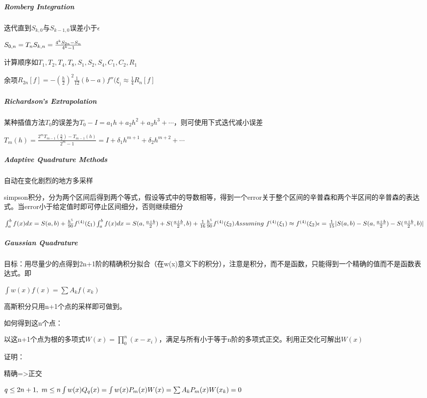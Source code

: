 \documentclass[]{article}
\let\oldsubparagraph\subparagraph
\renewcommand{\subparagraph}[1]{\oldsubparagraph{#1}\mbox{}}
\begin{document}
\begin{multicols}{3}
\subparagraph{Romberg Integration}\label{header-c5}

迭代直到\(S_{k,0}\)与\(S_{k-1,0}\)误差小于\(\epsilon\)

\(S_{0,n}=T_n\\
S_{k,n}=\frac{4^kS_{2n}-S_n}{4^k-1}\)

计算顺序如\(T_1, T_2, T_4,T_8,S_1,S_2,S_4,C_1,C_2,R_1\)

余项\(R_{2n}[f] = -(\frac h 2)^2\frac{1}{12}(b-a)f''(\xi_)\approx\frac 1 4 R_n[f]\)

\subparagraph{Richardson's Extrapolation}\label{header-c51}

某种插值方法\(T_0\)的误差为\(T_0-I=a_1h+a_2h^2+a_3h^3+\cdots\)，则可使用下式迭代减小误差

\(T_m(h)=\frac{2^m T_{m-1}(\frac h 2) - T_{m-1}(h)}{2^m-1}=I+\delta_1 h^{m+1}+\delta_2 h^{m+2}+\cdots\)

\subparagraph{Adaptive Quadrature Methods}\label{header-c61}

自动在变化剧烈的地方多采样

simpson积分，分为两个区间后得到两个等式，假设等式中的导数相等，得到一个error关于整个区间的辛普森和两个半区间的辛普森的表达式。当error小于给定值时即可停止区间细分，否则继续细分

\(\int_a^bf(x)dx=S(a,b)+\frac{h^5}{90}f^{(4)}(\xi_1)\\
\int_a^bf(x)dx=S(a,\frac{a+b}{2})+S(\frac{a+b}{2},b)+\frac {1}{16}\frac{h^5}{90}f^{(4)}(\xi_2)\\
Assuming\ f^{(4)}(\xi_1)\approx f^{(4)}(\xi_2)\\
\epsilon=\frac {1}{15}|S(a,b) - S(a ,\frac{a+b}{2}) -S(\frac{a+b}2,b)|\)

\subparagraph{Gaussian Quadrature}\label{header-c75}

目标：用尽量少的点得到2n+1阶的精确积分拟合（在w(x)意义下的积分），注意是积分，而不是函数，只能得到一个精确的值而不是函数表达式。即

\(\int w(x) f(x)=\sum A_kf(x_k)\)

高斯积分只用n+1个点的采样即可做到。

如何得到这n个点：

以这n+1个点为根的多项式\( W(x)=\prod_0^n(x-x_i) \)，满足与所有小于等于n阶的多项式正交。利用正交化可解出\(W(x)\)

证明：


精确=\textgreater{}正交

\(q \leq2n+1,\ m \leq n\\
\int w(x)Q_q(x)=\int w(x)P_m(x)W(x)=\sum A_kP_m(x)W(x_k) = 0\)


\end{multicols}
\end{document}
